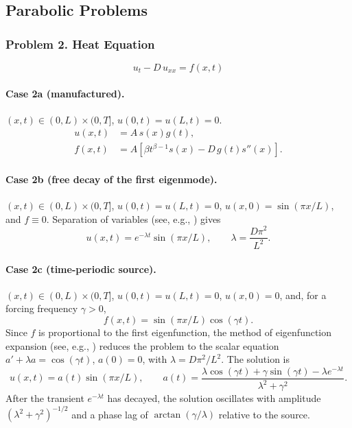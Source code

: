 \documentclass[11pt]{article}
\begin{document}
\subsection{Parabolic Problems}

\subsubsection*{Problem 2. Heat Equation}

\[
\boxed{u_t-D\,u_{xx}=f(x,t)}
\]

\paragraph{Case 2a (manufactured).}
$(x,t)\in(0,L)\times(0,T]$, $u(0,t)=u(L,t)=0$.
\[
\begin{aligned}
u(x,t)&=A\,s(x)g(t),\\
f(x,t)&=A\left[
\beta t^{\beta-1}s(x)-D\,g(t)s''(x)
\right].
\end{aligned}
\]

\paragraph{Case 2b (free decay of the first eigenmode).}
$(x,t)\in(0,L)\times(0,T]$, $u(0,t)=u(L,t)=0$,
$u(x,0)=\sin(\pi x/L)$, and $f\equiv0$. Separation of variables (see,
e.g., \cite[Ch.~4]{Str08}) gives
\[
u(x,t)=e^{-\lambda t}\sin(\pi x/L),
\qquad
\lambda=\frac{D\pi^2}{L^2}.
\]

\paragraph{Case 2c (time-periodic source).}
$(x,t)\in(0,L)\times(0,T]$, $u(0,t)=u(L,t)=0$, $u(x,0)=0$, and, for a
forcing frequency $\gamma>0$,
\[
f(x,t)=\sin(\pi x/L)\cos(\gamma t).
\]
Since $f$ is proportional to the first eigenfunction, the method of
eigenfunction expansion (see, e.g., \cite[Ch.~8]{Hab13}) reduces the
problem to the scalar equation $a'+\lambda a=\cos(\gamma t)$, $a(0)=0$,
with $\lambda=D\pi^2/L^2$. The solution is
\[
u(x,t)=a(t)\sin(\pi x/L),
\qquad
a(t)=\frac{\lambda\cos(\gamma t)+\gamma\sin(\gamma t)-\lambda e^{-\lambda t}}
{\lambda^2+\gamma^2}.
\]
After the transient $e^{-\lambda t}$ has decayed, the solution
oscillates with amplitude $(\lambda^2+\gamma^2)^{-1/2}$ and a phase lag
of $\arctan(\gamma/\lambda)$ relative to the source.
\end{document}
